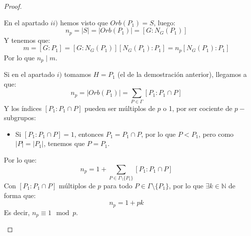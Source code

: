 \begin{teo}
\begin{proof}
\begin{enumerate}
                En el apartado $ii)$ hemos visto que $Orb(P_1) = S$, luego:
                \begin{equation*}
                    n_p = |S| = |Orb(P_1)| = [G:N_G(P_1)]
                \end{equation*}
                Y tenemos que:
                \begin{equation*}
                    m = [G:P_1] = [G:N_G(P_1)][N_G(P_1):P_1] = n_p[N_G(P_1):P_1]
                \end{equation*}
                Por lo que $n_p\mid m$.\newline

                Si en el apartado $i)$ tomamos $H=P_1$ (el de la demostración anterior), llegamos a que:
                \begin{equation*}
                    n_p = |Orb(P_1)| = \sum_{P\in \Gamma} [P_1:P_1\cap P]
                \end{equation*}
                Y los índices $[P_1:P_1\cap P]$ pueden ser múltiplos de $p$ o 1, por ser cociente de $p-$subgrupos:
                \begin{itemize}
                    \item Si $[P_1:P_1\cap P] = 1$, entonces $P_1 = P_1\cap P$, por lo que $P<P_1$, pero como $|P| = |P_1|$, tenemos que $P=P_1$.
                \end{itemize}
                Por lo que:
                \begin{equation*}
                    n_p = 1 + \sum_{P\in \Gamma\setminus\{P_1\}} [P_1:P_1\cap P]
                \end{equation*}
                Con $[P_1:P_1\cap P]$ múltiplos de $p$ para todo $P\in \Gamma\setminus\{P_1\}$, por lo que $\exists k\in \mathbb{N}$ de forma que:
                \begin{equation*}
                    n_p = 1 + pk
                \end{equation*}
                Es decir, $n_p\equiv 1 \mod p$.
        \end{enumerate}
    \end{proof}
\end{teo}

